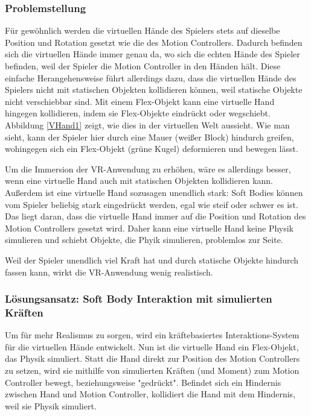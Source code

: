 \subsubsection{Problemstellung}
Für gewöhnlich werden die virtuellen Hände des Spielers stets auf dieselbe Position und Rotation gesetzt wie die des Motion Controllers. Dadurch befinden sich die virtuellen Hände immer genau da, wo sich die echten Hände des Spieler befinden, weil der Spieler die Motion Controller in den Händen hält.
Diese einfache Herangehensweise führt allerdings dazu, dass die virtuellen Hände des Spielers nicht mit statischen Objekten kollidieren können, weil statische Objekte nicht verschiebbar sind. Mit einem Flex-Objekt kann eine virtuelle Hand hingegen kollidieren, indem sie Flex-Objekte eindrückt oder wegschiebt. Abbildung \ref{VHand1} zeigt, wie dies in der virtuellen Welt aussieht. Wie man sieht, kann der Spieler hier durch eine Mauer (weißer Block) hindurch greifen, wohingegen sich ein Flex-Objekt (grüne Kugel) deformieren und bewegen lässt. 


Um die Immersion der VR-Anwendung zu erhöhen, wäre es allerdings besser, wenn eine virtuelle Hand auch mit statischen Objekten kollidieren kann. Außerdem ist eine virtuelle Hand sozusagen unendlich stark: Soft Bodies können vom Spieler beliebig stark eingedrückt werden, egal wie steif oder schwer es ist. Das liegt daran, dass die virtuelle Hand immer auf die Position und Rotation des Motion Controllers gesetzt wird. Daher kann eine virtuelle Hand keine Physik simulieren und schiebt Objekte, die Phyik simulieren, problemlos zur Seite.

Weil der Spieler unendlich viel Kraft hat und durch statische Objekte hindurch fassen kann, wirkt die VR-Anwendung wenig realistisch.

\subsubsection{Lösungsansatz: Soft Body Interaktion mit simulierten Kräften}
Um für mehr Realismus zu sorgen, wird ein kräftebasiertes Interaktions-System für die virtuellen Hände entwickelt. Nun ist die virtuelle Hand ein Flex-Objekt, das Physik simuliert. Statt die Hand direkt zur Position des Motion Controllers zu setzen, wird sie mithilfe von simulierten Kräften (und Moment) zum Motion Controller bewegt, beziehungsweise "gedrückt". Befindet sich ein Hindernis zwischen Hand und Motion Controller, kollidiert die Hand mit dem Hindernis, weil sie Physik simuliert. 


